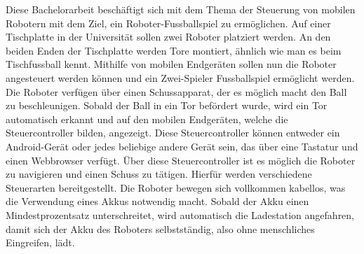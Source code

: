Diese Bachelorarbeit beschäftigt sich mit dem Thema der Steuerung von mobilen Robotern mit dem Ziel, ein Roboter-Fussballspiel zu ermöglichen. Auf einer Tischplatte in der Universität sollen zwei Roboter platziert werden. An den beiden Enden der Tischplatte werden Tore montiert, ähnlich wie man es beim Tischfussball kennt. Mithilfe von mobilen Endgeräten sollen nun die Roboter angesteuert werden können und ein Zwei-Spieler Fussballspiel ermöglicht werden. Die Roboter verfügen über einen Schussapparat, der es möglich macht den Ball zu beschleunigen. Sobald der Ball in ein Tor befördert wurde, wird ein Tor automatisch erkannt und auf den mobilen Endgeräten, welche die Steuercontroller bilden, angezeigt. Diese Steuercontroller können entweder ein Android-Gerät oder jedes beliebige andere Gerät sein, das über eine Tastatur und einen Webbrowser verfügt. Über diese Steuercontroller ist es möglich die Roboter zu navigieren und einen Schuss zu tätigen. Hierfür werden verschiedene Steuerarten bereitgestellt. 
Die Roboter bewegen sich vollkommen kabellos, was die Verwendung eines Akkus notwendig macht. Sobald der Akku einen Mindestprozentsatz unterschreitet, wird automatisch die Ladestation angefahren, damit sich der Akku des Roboters selbstständig, also ohne menschliches Eingreifen, lädt.
